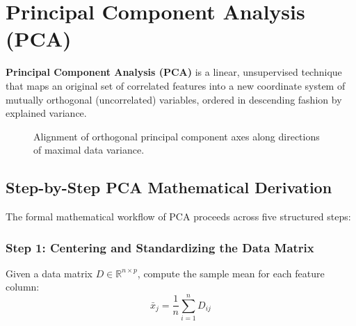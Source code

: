 \section{Principal Component Analysis (PCA)}
\label{sec:dm-pca}

\textbf{Principal Component Analysis (PCA)} is a linear, unsupervised technique that maps an original set of correlated features into a new coordinate system of mutually orthogonal (uncorrelated) variables, ordered in descending fashion by explained variance.

\begin{figure}[htbp]
    \centering
    \caption{Alignment of orthogonal principal component axes along directions of maximal data variance.}
    \label{fig:dm-pca-axes}
\end{figure}

\subsection{Step-by-Step PCA Mathematical Derivation}

The formal mathematical workflow of PCA proceeds across five structured steps:

\subsubsection{Step 1: Centering and Standardizing the Data Matrix}
Given a data matrix $D \in \mathbb{R}^{n \times p}$, compute the sample mean for each feature column:
\begin{equation}
    \bar{x}_j = \frac{1}{n}\sum_{i=1}^n D_{ij}
\end{equation}

